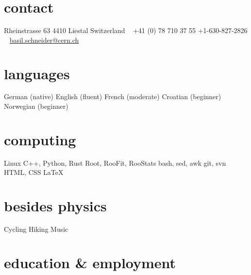 \documentclass[]{cv} %
\begin{document}


\begin{aside} %
  \section{contact}
  Rheinstrasse 63
  4410 Liestal
  Switzerland
  ~
  +41 (0) 78 710 37 55
  +1-630-827-2826
  ~
  \href{mailto:basil.schneider@cern.ch}{basil.schneider@cern.ch}
  \section{languages}
  German (native)
  English (fluent)
  French (moderate)
  Croatian (beginner)
  Norwegian (beginner)
  \section{computing}
  Linux
  C++, Python, Rust
  Root, RooFit, RooStats
  bash, sed, awk
  git, svn
  HTML, CSS
  \LaTeX
  \section{besides physics}
  Cycling
  Hiking
  Music
\end{aside}


\section{education \& employment}
\end{document}
